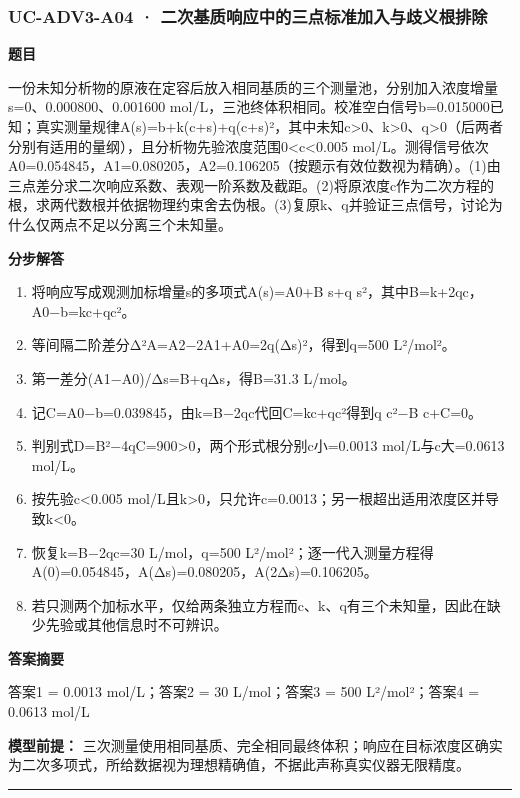 \documentclass[UTF8,11pt,a4paper]{ctexart}
\begin{document}
\subsubsection*{UC-ADV3-A04 · 二次基质响应中的三点标准加入与歧义根排除}
\noindent\textbf{题目}\par
一份未知分析物的原液在定容后放入相同基质的三个测量池，分别加入浓度增量s=0、0.000800、0.001600 mol/L，三池终体积相同。校准空白信号b=0.015000已知；真实测量规律A(s)=b+k(c+s)+q(c+s)²，其中未知c>0、k>0、q>0（后两者分别有适用的量纲），且分析物先验浓度范围0<c<0.005 mol/L。测得信号依次A0=0.054845，A1=0.080205，A2=0.106205（按题示有效位数视为精确）。(1)由三点差分求二次响应系数、表观一阶系数及截距。(2)将原浓度c作为二次方程的根，求两代数根并依据物理约束舍去伪根。(3)复原k、q并验证三点信号，讨论为什么仅两点不足以分离三个未知量。\par
\medskip\noindent\textbf{分步解答}
\begin{enumerate}
\item 将响应写成观测加标增量s的多项式A(s)=A0+B s+q s²，其中B=k+2qc，A0−b=kc+qc²。
\item 等间隔二阶差分Δ²A=A2−2A1+A0=2q(Δs)²，得到q=500 L²/mol²。
\item 第一差分(A1−A0)/Δs=B+qΔs，得B=31.3 L/mol。
\item 记C=A0−b=0.039845，由k=B−2qc代回C=kc+qc²得到q c²−B c+C=0。
\item 判别式D=B²−4qC=900>0，两个形式根分别c小=0.0013 mol/L与c大=0.0613 mol/L。
\item 按先验c<0.005 mol/L且k>0，只允许c=0.0013；另一根超出适用浓度区并导致k<0。
\item 恢复k=B−2qc=30 L/mol，q=500 L²/mol²；逐一代入测量方程得A(0)=0.054845，A(Δs)=0.080205，A(2Δs)=0.106205。
\item 若只测两个加标水平，仅给两条独立方程而c、k、q有三个未知量，因此在缺少先验或其他信息时不可辨识。
\end{enumerate}
\noindent\textbf{答案摘要}\par
答案1 = 0.0013 mol/L；答案2 = 30 L/mol；答案3 = 500 L²/mol²；答案4 = 0.0613 mol/L\par
\noindent\textbf{模型前提：}
三次测量使用相同基质、完全相同最终体积；响应在目标浓度区确实为二次多项式，所给数据视为理想精确值，不据此声称真实仪器无限精度。\par
\medskip\hrule\medskip
{}
\end{document}
